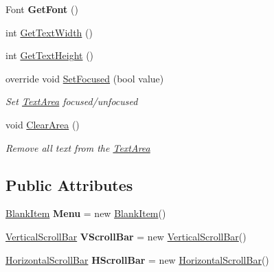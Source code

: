\begin{DoxyCompactItemize}
Font {\bfseries Get\+Font} ()
\item 
int \mbox{\hyperlink{class_space_v_i_l_1_1_text_area_a19980d0c54de49f002d4ab25361ace48}{Get\+Text\+Width}} ()
\item 
int \mbox{\hyperlink{class_space_v_i_l_1_1_text_area_a85d630a3172003bedf81d0a7cf285792}{Get\+Text\+Height}} ()
\item 
override void \mbox{\hyperlink{class_space_v_i_l_1_1_text_area_a5d099f8cf11140e0fdaafdbc3c30a7c3}{Set\+Focused}} (bool value)
\begin{DoxyCompactList}\small\item\em Set \mbox{\hyperlink{class_space_v_i_l_1_1_text_area}{Text\+Area}} focused/unfocused \end{DoxyCompactList}\item 
void \mbox{\hyperlink{class_space_v_i_l_1_1_text_area_a698e7fe3b617f824c8e10a11c81a9a51}{Clear\+Area}} ()
\begin{DoxyCompactList}\small\item\em Remove all text from the \mbox{\hyperlink{class_space_v_i_l_1_1_text_area}{Text\+Area}} \end{DoxyCompactList}\end{DoxyCompactItemize}
\subsection*{Public Attributes}
\begin{DoxyCompactItemize}
\item 
\mbox{\label{class_space_v_i_l_1_1_text_area_a4ef57a1d10c088c539cfb9a8070f43a2}} 
\mbox{\hyperlink{class_space_v_i_l_1_1_blank_item}{Blank\+Item}} {\bfseries Menu} = new \mbox{\hyperlink{class_space_v_i_l_1_1_blank_item}{Blank\+Item}}()
\item 
\mbox{\label{class_space_v_i_l_1_1_text_area_aacb07f2009686759f6d1864e7054f0c9}} 
\mbox{\hyperlink{class_space_v_i_l_1_1_vertical_scroll_bar}{Vertical\+Scroll\+Bar}} {\bfseries V\+Scroll\+Bar} = new \mbox{\hyperlink{class_space_v_i_l_1_1_vertical_scroll_bar}{Vertical\+Scroll\+Bar}}()
\item 
\mbox{\label{class_space_v_i_l_1_1_text_area_aa230465bbefad4dfdfd1cb1049fe66e8}} 
\mbox{\hyperlink{class_space_v_i_l_1_1_horizontal_scroll_bar}{Horizontal\+Scroll\+Bar}} {\bfseries H\+Scroll\+Bar} = new \mbox{\hyperlink{class_space_v_i_l_1_1_horizontal_scroll_bar}{Horizontal\+Scroll\+Bar}}()
\end{DoxyCompactItemize}

